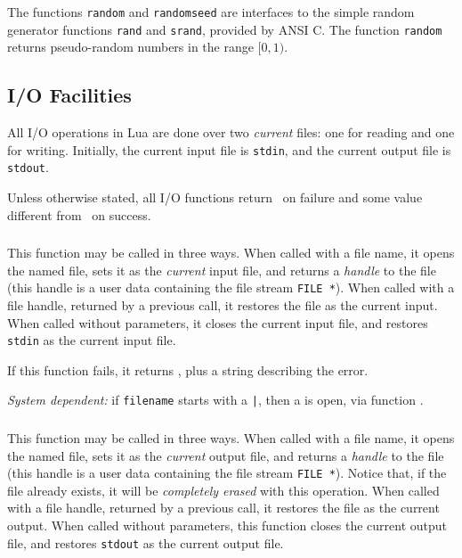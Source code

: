 The functions \verb'random' and \verb'randomseed' are interfaces to
the simple random generator functions \verb'rand' and \verb'srand',
provided by ANSI C.
The function \verb'random' returns pseudo-random numbers in the range
$[0,1)$.


\subsection{I/O Facilities} \label{libio}

All I/O operations in Lua are done over two {\em current} files:
one for reading and one for writing.
Initially, the current input file is \verb'stdin',
and the current output file is \verb'stdout'.

Unless otherwise stated,
all I/O functions return \nil\ on failure and
some value different from \nil\ on success.

\subsubsection*{}

This function may be called in three ways.
When called with a file name,
it opens the named file,
sets it as the {\em current} input file,
and returns a {\em handle} to the file
(this handle is a user data containing the file stream \verb|FILE *|).
When called with a file handle, returned by a previous call,
it restores the file as the current input.
When called without parameters,
it closes the current input file,
and restores \verb'stdin' as the current input file.

If this function fails, it returns \nil,
plus a string describing the error.

{\em System dependent:} if \verb'filename' starts with a \verb'|',
then a  is open, via function .

\subsubsection*{}

This function may be called in three ways.
When called with a file name,
it opens the named file,
sets it as the {\em current} output file,
and returns a {\em handle} to the file
(this handle is a user data containing the file stream \verb|FILE *|).
Notice that, if the file already exists,
it will be {\em completely erased} with this operation.
When called with a file handle, returned by a previous call,
it restores the file as the current output.
When called without parameters,
this function closes the current output file,
and restores \verb'stdout' as the current output file.

